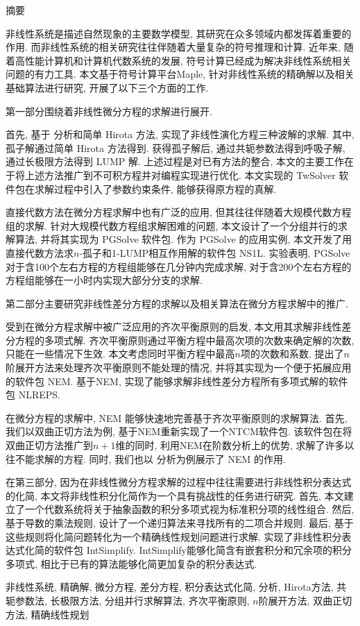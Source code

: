 \clearpage%
\thispagestyle{plain}
{}

\centerline{\heiti 摘\quad 要}

\linespread{1.4} \bigskip

非线性系统是描述自然现象的主要数学模型, 其研究在众多领域内都发挥着重要的作用. 而非线性系统的相关研究往往伴随着大量复杂的符号推理和计算. 近年来, 随着高性能计算机和计算机代数系统的发展, 符号计算已经成为解决非线性系统相关问题的有力工具. 本文基于符号计算平台Maple, 针对非线性系统的精确解以及相关基础算法进行研究, 开展了以下三个方面的工作. 

第一部分围绕着非线性微分方程的求解进行展开. 

首先, 基于 \Painleve{} 分析和简单 Hirota 方法, 实现了非线性演化方程三种波解的求解. 其中, 孤子解通过简单 Hirota 方法得到. 获得孤子解后, 通过共轭参数法得到呼吸子解, 通过长极限方法得到 LUMP 解. 上述过程是对已有方法的整合, 本文的主要工作在于将上述方法推广到不可积方程并对编程实现进行优化. 本文实现的 TwSolver 软件包在求解过程中引入了参数约束条件, 能够获得原方程的真解.  

直接代数方法在微分方程求解中也有广泛的应用, 但其往往伴随着大规模代数方程组的求解. 针对大规模代数方程组求解困难的问题, 本文设计了一个分组并行的求解算法, 并将其实现为 PGSolve 软件包. 作为 PGSolve 的应用实例, 本文开发了用直接代数方法求$n$-孤子和1-LUMP相互作用解的软件包 NS1L. 实验表明, PGSolve 对于含100个左右方程的方程组能够在几分钟内完成求解, 对于含200个左右方程的方程组能够在一小时内实现大部分分支的求解. 

第二部分主要研究非线性差分方程的求解以及相关算法在微分方程求解中的推广. 

受到在微分方程求解中被广泛应用的齐次平衡原则的启发, 本文用其求解非线性差分方程的多项式解. 齐次平衡原则通过平衡方程中最高次项的次数来确定解的次数, 只能在一些情况下生效. 本文考虑同时平衡方程中最高$n$项的次数和系数, 提出了$n$阶展开方法来处理齐次平衡原则不能处理的情况, 并将其实现为一个便于拓展应用的软件包 NEM. 基于NEM, 实现了能够求解非线性差分方程所有多项式解的软件包 NLREPS. 

在微分方程的求解中, NEM 能够快速地完善基于齐次平衡原则的求解算法. 首先, 我们以双曲正切方法为例, 基于NEM重新实现了一个NTCM软件包. 该软件包在将双曲正切方法推广到$n+1$维的同时, 利用NEM在阶数分析上的优势, 求解了许多以往不能求解的方程. 同时, 我们也以 \Painleve{} 分析为例展示了 NEM 的作用. 

在第三部分, 因为在非线性微分方程求解的过程中往往需要进行非线性积分表达式的化简, 本文将非线性积分化简作为一个具有挑战性的任务进行研究. 首先, 本文建立了一个代数系统将关于抽象函数的积分多项式视为标准积分项的线性组合. 然后, 基于导数的乘法规则, 设计了一个递归算法来寻找所有的二项合并规则. 最后, 基于这些规则将化简问题转化为一个精确线性规划问题进行求解, 实现了非线性积分表达式化简的软件包 IntSimplify.  IntSimplify能够化简含有嵌套积分和冗余项的积分多项式, 相比于已有的算法能够化简更加复杂的积分表达式. 

\bigskip

非线性系统, 精确解, 微分方程, 差分方程, 积分表达式化简, \Painleve{}分析, Hirota方法, 共轭参数法, 长极限方法, 分组并行求解算法, 齐次平衡原则, $n$阶展开方法, 双曲正切方法, 精确线性规划



